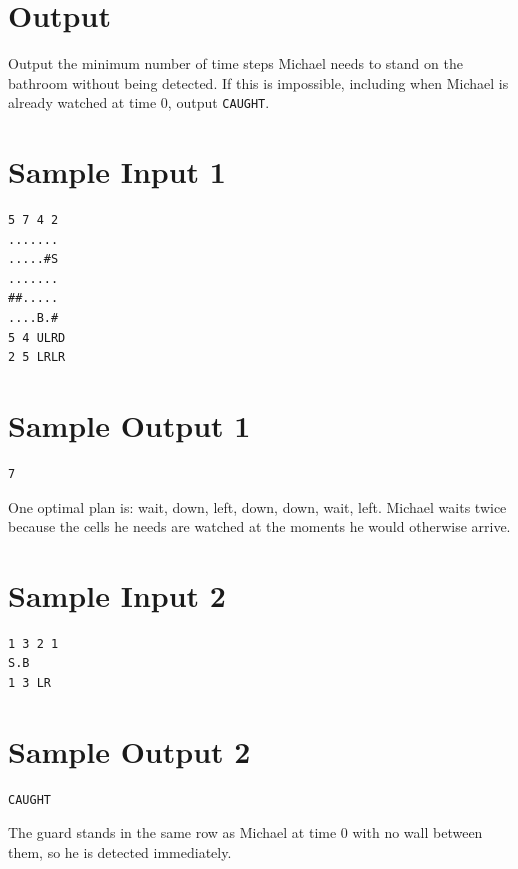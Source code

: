 \documentclass[11pt]{article}
\begin{document}
\section*{Output}

Output the minimum number of time steps Michael needs to stand on the bathroom without being detected.
If this is impossible, including when Michael is already watched at time $0$, output \texttt{CAUGHT}.

\section*{Sample Input 1}
\begin{verbatim}
5 7 4 2
.......
.....#S
.......
##.....
....B.#
5 4 ULRD
2 5 LRLR
\end{verbatim}

\section*{Sample Output 1}
\begin{verbatim}
7
\end{verbatim}

One optimal plan is: wait, down, left, down, down, wait, left.
Michael waits twice because the cells he needs are watched at the moments he would otherwise arrive.

\section*{Sample Input 2}
\begin{verbatim}
1 3 2 1
S.B
1 3 LR
\end{verbatim}

\section*{Sample Output 2}
\begin{verbatim}
CAUGHT
\end{verbatim}

The guard stands in the same row as Michael at time $0$ with no wall between them, so he is detected immediately.
\end{document}
